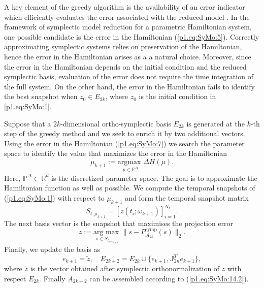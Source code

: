 A key element of the greedy algorithm is the availability of an error indicator which efficiently evaluates the error associated with the reduced model \cite{hesthaven2015certified}. In the framework of symplectic model reduction for a parametric Hamiltonian system, one possible candidate is the error in the Hamiltonian (\ref{p1.eq:SyMo:5}). Correctly approximating symplectic systems relies on preservation of the Hamiltonian, hence the error in the Hamiltonian arises as a a natural choice. Moreover, since the error in the Hamiltonian depends on the initial condition and the reduced symplectic basis, evaluation of the error does not require the time integration of the full system. On the other hand, the error in the Hamiltonian fails to identify the best snapshot when $z_0\in E_{2k}$, where $z_0$ is the initial condition in \eqref{p1.eq:SyMo:1}.

Suppose that a $2k$-dimensional ortho-symplectic basis $E_{2k}$ is generated at the $k$-th step of the greedy method and we seek to enrich it by two additional vectors. Using the error in the Hamiltonian (\ref{p1.eq:SyMo:7}) we search the parameter space to identify the value that maximizes the error in the Hamiltonian
\begin{equation} \label{eq:SyMo:14.5}
	\mu_{k+1} := \underset{\mu\in \mathbb P^{\Delta}}{\text{argmax }}\Delta H(\mu).
\end{equation}
Here, $\mathbb P^{\Delta} \subset \mathbb R^{d}$ is the discretized parameter space. The goal is to approximate the Hamiltonian function as well as possible. We compute the temporal snapshots of (\ref{p1.eq:SyMo:1}) with respect to $\mu_{k+1}$ and form the temporal snapshot matrix
\begin{equation}
	S_{t,\mu_{k+1}}= [ z(t_i;\omega_{k+1}) ]_{i=1}^{N_t}.
\end{equation} 
The next basis vector is the snapshot that maximises the projection error 
\begin{equation} \label{eq:SyMo:14.6}
	z := \underset{s\in S_{t,\mu_{k+1}}}{\text{arg\ max }} \| s - P_{\mathcal A_{2k}}^{\text{symp}}(s) \|_2.
\end{equation}
Finally, we update the basis as
\begin{equation} \label{eq:SyMo:14.7}
	e_{k+1} = \tilde z, \quad E_{2k+2} = E_{2k}\cup \{ e_{k+1} , \mathbb J_{2n}^Te_{k+1} \},
\end{equation}
where $\tilde z$ is the vector obtained after symplectic orthonormalization of $z$ with respect $E_{2k}$. Finally $A_{2k+2}$ can be assembled according to (\ref{p1.eq:SyMo:14.2}).

